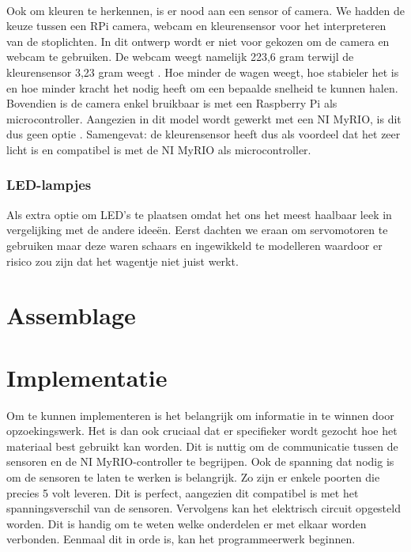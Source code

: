 \documentclass[a4paper,twoside,kulak]{kulakreport} %
\begin{document}
~

Ook om kleuren te herkennen, is er nood aan een sensor of camera. We hadden de keuze tussen een RPi camera, webcam en kleurensensor voor het interpreteren van de stoplichten. In dit ontwerp wordt er niet voor gekozen om de camera en webcam te gebruiken. De webcam weegt namelijk 223,6 gram terwijl de kleurensensor 3,23 gram weegt \cite{Webcam,TCS34725KleurSensorBOB}. Hoe minder de wagen weegt, hoe stabieler het is en hoe minder kracht het nodig heeft om een bepaalde snelheid te kunnen halen. Bovendien is de camera enkel bruikbaar is met een Raspberry Pi als microcontroller. Aangezien in dit model wordt gewerkt met een NI MyRIO, is dit dus geen optie \cite{RPi-camera}. Samengevat: de kleurensensor heeft dus als voordeel dat het zeer licht is en compatibel is met de NI MyRIO als microcontroller.
\label{Sensoren}
~

\subsubsection{LED-lampjes}
Als extra optie om LED's te plaatsen omdat het ons het meest haalbaar leek in vergelijking met de andere ideeën. Eerst dachten we eraan om servomotoren te gebruiken maar deze waren schaars en ingewikkeld te modelleren waardoor er risico zou zijn dat het wagentje niet juist werkt.


\section{Assemblage}

\section{Implementatie}\label{Implementatie}
Om te kunnen implementeren is het belangrijk om informatie in te winnen door opzoekingswerk. Het is dan ook cruciaal dat er specifieker wordt gezocht hoe het materiaal best gebruikt kan worden.
Dit is nuttig om de communicatie tussen de sensoren en de NI MyRIO-controller te begrijpen. Ook de spanning dat nodig is om de sensoren te laten te werken is belangrijk. Zo zijn er enkele poorten die precies 5 volt leveren. Dit is perfect, aangezien dit compatibel is met het spanningsverschil van de sensoren. Vervolgens kan het elektrisch circuit opgesteld worden. Dit is handig om te weten welke onderdelen er met elkaar worden verbonden. Eenmaal dit in orde is, kan het programmeerwerk beginnen.
\end{document}
